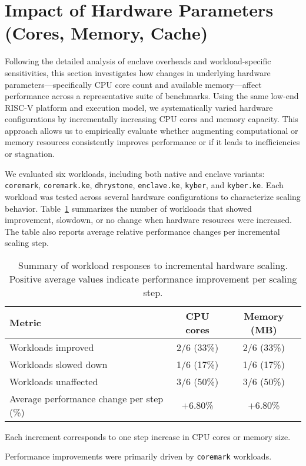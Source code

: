\section{Impact of Hardware Parameters (Cores, Memory, Cache)}
\label{sec:hardware-impact}

Following the detailed analysis of enclave overheads and workload-specific sensitivities, this section investigates how changes in underlying hardware parameters—specifically CPU core count and available memory—affect performance across a representative suite of benchmarks. Using the same low-end RISC-V platform and execution model, we systematically varied hardware configurations by incrementally increasing CPU cores and memory capacity. This approach allows us to empirically evaluate whether augmenting computational or memory resources consistently improves performance or if it leads to inefficiencies or stagnation.

We evaluated six workloads, including both native and enclave variants: \texttt{coremark}, \texttt{coremark.ke}, \texttt{dhrystone}, \texttt{enclave.ke}, \texttt{kyber}, and \texttt{kyber.ke}. Each workload was tested across several hardware configurations to characterize scaling behavior. Table~\ref{tab:hardware-impact} summarizes the number of workloads that showed improvement, slowdown, or no change when hardware resources were increased. The table also reports average relative performance changes per incremental scaling step.

\begin{table}[htbp]
\centering
\begin{threeparttable}
\caption{Summary of workload responses to incremental hardware scaling. Positive average values indicate performance improvement per scaling step.}
\label{tab:hardware-impact}
\begin{tabular}{@{}lcc@{}}
\toprule
\textbf{Metric} & \textbf{CPU cores} & \textbf{Memory (MB)} \\
\midrule
Workloads improved                      & 2/6 (33\%) & 2/6 (33\%) \\
Workloads slowed down                   & 1/6 (17\%) & 1/6 (17\%) \\
Workloads unaffected                    & 3/6 (50\%) & 3/6 (50\%) \\
Average performance change per step (\%)& +6.80\%    & +6.80\%    \\
\bottomrule
\end{tabular}
\begin{tablenotes}
\footnotesize
\item Each increment corresponds to one step increase in CPU cores or memory size.
\item Performance improvements were primarily driven by \texttt{coremark} workloads.
\end{tablenotes}
\end{threeparttable}
\end{table}

